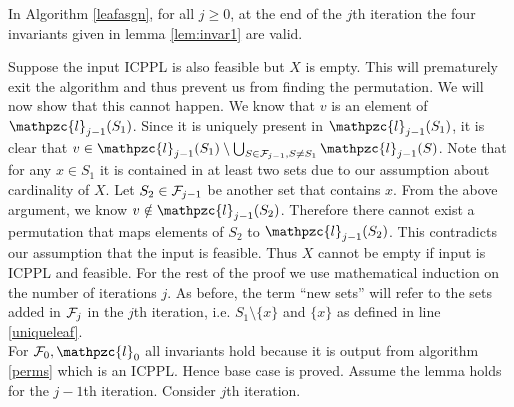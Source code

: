 \documentclass{fsttcs}
\def\cF{{\cal F}}
\def\cl{\mathpzc{l}}
\begin{document}
\begin{lemma}
\label{lem:invar3}
In Algorithm \ref{leafasgn}, for all $j \geq 0$, at the end of the
$j$th iteration the four invariants given in lemma \ref{lem:invar1}
are valid.  
\end{lemma}
\proof
  Suppose the input ICPPL is also feasible but $X$ is empty. This will
  prematurely exit the algorithm and thus prevent us from finding the
  permutation.  We will now show that this cannot happen. We know that
  $v$ is an element of $\cl_{j-1}(S_1)$. Since it is uniquely present
  in $\cl_{j-1}(S_1)$, it is clear that $v \in \cl_{j-1}(S_1)
  \setminus \bigcup_{S \in \cF_{j-1}, S \ne S_1}\cl_{j-1}(S)$.  Note
  that for any $x \in S_1$ it is contained in at least two sets due to
  our assumption about cardinality of $X$. Let $S_2 \in \cF_{j-1}$ be
  another set that contains $x$. From the above argument, we know $v
  \notin \cl_{j-1}(S_2)$. Therefore there cannot exist a permutation
  that maps elements of $S_2$ to $\cl_{j-1}(S_2)$. This contradicts
  our assumption that the input is feasible. Thus $X$ cannot be empty
  if input is ICPPL and feasible.
  For the rest of the proof we use mathematical induction on the
  number of iterations $j$. As before, the term ``new sets'' will
  refer to the sets added in $\cF_j$ in the $j$th iteration, i.e. $S_1
  \setminus \{x\}$ and $\{x\}$ as defined in line \ref{uniqueleaf}.\\
  For $\cF_0, \cl_0$ all invariants hold because it is output from
  algorithm \ref{perms} which is an ICPPL. Hence base case is proved.
  Assume the lemma holds for the $j-1$th iteration. Consider $j$th
  iteration. 
  \noindent
\end{document}
